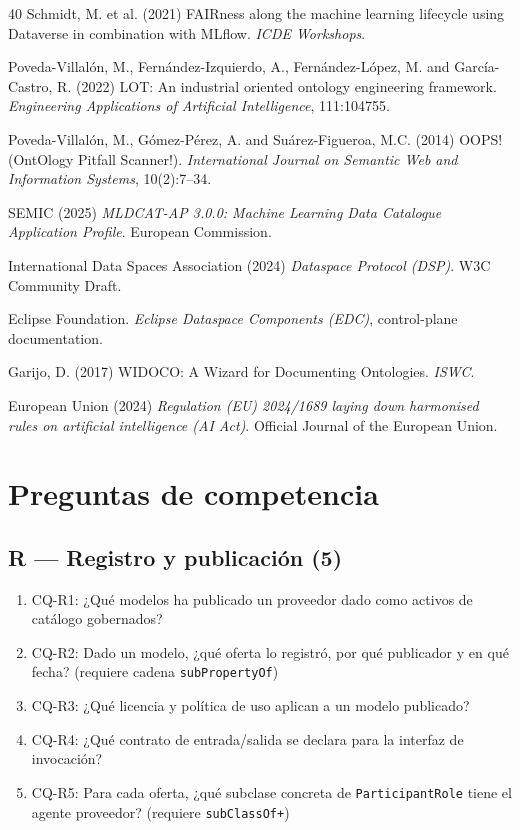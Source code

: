 \documentclass[Afour,sagev,times]{sagej}
\newcommand{\code}[1]{\texttt{#1}}
\newcommand{\cq}[1]{\textsf{#1}}
\begin{document}
\begin{thebibliography}{40}
 Schmidt, M. et al. (2021) FAIRness along the machine learning lifecycle using Dataverse in combination with MLflow. \emph{ICDE Workshops}.

 Poveda-Villalón, M., Fernández-Izquierdo, A., Fernández-López, M. and García-Castro, R. (2022) LOT: An industrial oriented ontology engineering framework. \emph{Engineering Applications of Artificial Intelligence}, 111:104755.

 Poveda-Villalón, M., Gómez-Pérez, A. and Suárez-Figueroa, M.C. (2014) OOPS! (OntOlogy Pitfall Scanner!). \emph{International Journal on Semantic Web and Information Systems}, 10(2):7--34.

 SEMIC (2025) \emph{MLDCAT-AP 3.0.0: Machine Learning Data Catalogue Application Profile}. European Commission.

 International Data Spaces Association (2024) \emph{Dataspace Protocol (DSP)}. W3C Community Draft.

 Eclipse Foundation. \emph{Eclipse Dataspace Components (EDC)}, control-plane documentation.

 Garijo, D. (2017) WIDOCO: A Wizard for Documenting Ontologies. \emph{ISWC}.

 European Union (2024) \emph{Regulation (EU) 2024/1689 laying down harmonised rules on artificial intelligence (AI Act)}. Official Journal of the European Union.

\end{thebibliography}

\appendix

\section{Preguntas de competencia}\label{app:cqs}

\subsection*{R --- Registro y publicación (5)}
\begin{enumerate}[label=\arabic*., leftmargin=*]
\item \cq{CQ-R1}: ¿Qué modelos ha publicado un proveedor dado como activos de catálogo gobernados?
\item \cq{CQ-R2}: Dado un modelo, ¿qué oferta lo registró, por qué publicador y en qué fecha? (requiere cadena \code{subPropertyOf})
\item \cq{CQ-R3}: ¿Qué licencia y política de uso aplican a un modelo publicado?
\item \cq{CQ-R4}: ¿Qué contrato de entrada/salida se declara para la interfaz de invocación?
\item \cq{CQ-R5}: Para cada oferta, ¿qué subclase concreta de \code{ParticipantRole} tiene el agente proveedor? (requiere \code{subClassOf+})
\end{enumerate}
\end{document}
